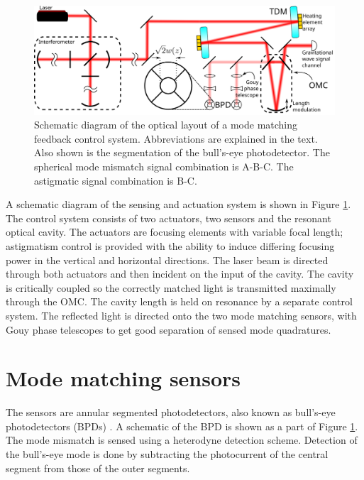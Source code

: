 \begin{figure}
  \begin{center}
  \leavevmode
  \includegraphics[width=\textwidth]{figs-modematching/blockdiag}
  \end{center}
  \caption[Schematic diagram of the optical layout of a mode matching feedback control system.]{Schematic diagram of the optical layout of a mode matching feedback control system. Abbreviations are explained in the text. Also shown is the segmentation of the bull's-eye photodetector. The spherical mode mismatch signal combination is A-B-C. The astigmatic signal combination is B-C.}
  \label{fig:mmblockdiag}
\end{figure}
A schematic diagram of the sensing and actuation system is shown in Figure \ref{fig:mmblockdiag}. %
The control system consists of two actuators, two sensors and the resonant optical cavity. %
The actuators are focusing elements with variable focal length; astigmatism control is provided with the ability to induce differing focusing power in the vertical and horizontal directions. %
The laser beam is directed through both actuators and then incident on the input of the cavity. %
The cavity is critically coupled so the correctly matched light is transmitted maximally through the OMC. %
The cavity length is held on resonance by a separate control system. %
The reflected light is directed onto the two mode matching sensors, with Gouy phase telescopes to get good separation of sensed mode quadratures.

\section{Mode matching sensors}
The sensors are annular segmented photodetectors, also known as bull's-eye photodetectors (BPDs) \cite{Mueller:00}. %
A schematic of the BPD is shown as a part of Figure \ref{fig:mmblockdiag}. %
The mode mismatch is sensed using a heterodyne detection scheme. %
Detection of the bull's-eye mode is done by subtracting the photocurrent of the central segment from those of the outer segments. %


